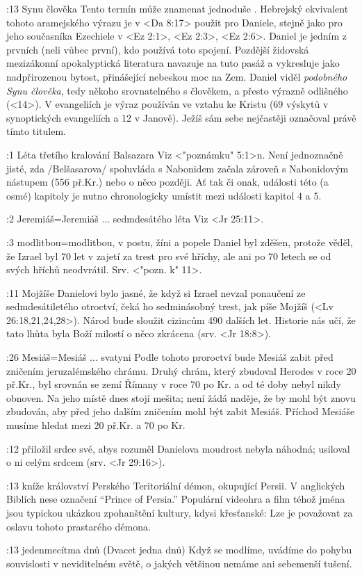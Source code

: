 :13 {Synu člověka} Tento termín může znamenat jednoduše . Hebrejský
   ekvivalent tohoto aramejského výrazu je v <Da 8:17>  použit pro Daniele, stejně jako pro jeho současníka
   Ezechiele v <Ez 2:1>, <Ez 2:3>, <Ez 2:6>. 
   Daniel je jedním z prvních (ne\discretionary{-}{-}{-}li
   vůbec první), kdo používá toto spojení.  Pozdější židovská mezizákonní apokalyptická
   literatura navazuje na tuto pasáž a vykresluje  jako nadpřirozenou bytost,
   přinášející nebeskou moc na Zem. Daniel viděl {\em podobného Synu člověka}, tedy někoho srovnatelného s člověkem, a přesto výrazně odlišného (<14>). V evangeliích  je výraz  používán ve vztahu ke Kristu (69 výskytů v synoptických evangeliích a 12 v Janově). Ježíš sám sebe nejčastěji označoval právě tímto titulem.
   
:1 {Léta třetího kralování Balsazara}
     Viz <"poznámku" 5:1>n. Není jednoznačně jisté, zda \x/Belšasarova/
     spoluvláda s Nabonidem začala zároveň s Nabonidovým nástupem (556 př.Kr.) nebo o něco
     později. Ať tak či onak, události této (a osmé) kapitoly je nutno chronologicky umístit
     mezi události kapitol 4 a 5. 

:2 {Jeremiáš}={Jeremiáš ... sedmdesátého léta} Viz <Jr 25:11>.

:3 {modlitbou}={modlitbou, v postu, žíni a popele} Daniel byl zděšen, protože věděl, že Izrael byl 70 let v zajetí za trest pro své hříchy, ale ani po 70 letech se od svých hříchů neodvrátil. Srv. <"pozn. k" 11>.

:11 {Mojžíše} Danielovi bylo jasné, že když si Izrael nevzal ponaučení ze sedmdesátiletého otroctví, čeká ho sedminásobný trest, jak píše Mojžíš (<Lv 26:18,21,24,28>). Národ bude sloužit cizincům 490 dalších let. Historie nás učí, že tato lhůta byla Boží milostí o něco zkrácena (srv. <Jr 18:8>).
\dopsat

:26 {Mesiáš}={Mesiáš ... svatyni} Podle tohoto proroctví bude Mesiáš zabit před zničením jeruzalémského chrámu.
Druhý chrám, který zbudoval Herodes v roce 20 př.Kr., byl srovnán se zemí Římany v roce 70 po Kr. a od té doby nebyl nikdy obnoven. Na jeho místě dnes stojí mešita; není žádá naděje, že by mohl být znovu zbudován, aby před jeho dalším zničením mohl být zabit Mesiáš. Příchod Mesiáše musíme hledat mezi 20 př.Kr. a 70 po Kr.

:12 {přiložil srdce své, abys rozuměl} Danielova moudrost nebyla náhodná; usiloval o ni celým srdcem (srv. <Jr 29:16>). 

:13 {kníže království Perského} Teritoriální démon, okupující Persii. V anglických Biblích nese označení ``Prince of Persia.'' Populární videohra a film téhož jména jsou typickou ukázkou zpohanštění kultury, kdysi křesťanské: Lze je považovat za oslavu tohoto prastarého démona.

:13 {jedenmecítma dnů} (Dvacet jedna dnů) Když se modlíme, uvádíme do pohybu souvislosti v neviditelném světě, o jakých většinou nemáme ani sebemenší tušení.







\endinput
